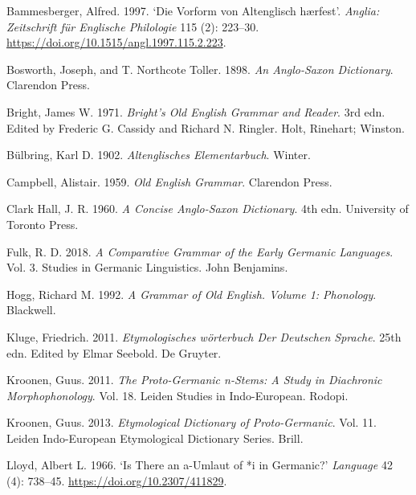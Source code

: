 \documentclass[
  british,
  a4paper,
]{article}
\newlength{\cslhangindent}
\newenvironment{CSLReferences}[2] %
 {\begin{list}{}{%
  \setlength{\itemindent}{0pt}
  \setlength{\leftmargin}{0pt}
  \setlength{\parsep}{0pt}
  \ifodd #1
   \setlength{\leftmargin}{\cslhangindent}
   \setlength{\itemindent}{-1\cslhangindent}
  \fi
  \setlength{\itemsep}{#2\baselineskip}}}
 {\end{list}}
\begin{document}
\protect{}\label{refs}
\begin{CSLReferences}{1}{1}
Bammesberger, Alfred. 1997. {`Die Vorform von Altenglisch {h{æ}rfest}'}.
\emph{Anglia: Zeitschrift f{ü}r Englische Philologie} 115 (2): 223--30.
\url{https://doi.org/10.1515/angl.1997.115.2.223}.

Bosworth, Joseph, and T. Northcote Toller. 1898. \emph{An {Anglo-Saxon}
Dictionary}. Clarendon Press.

Bright, James W. 1971. \emph{Bright's {Old English} Grammar and Reader}.
3rd edn. Edited by Frederic G. Cassidy and Richard N. Ringler. Holt,
Rinehart; Winston.

Bülbring, Karl D. 1902. \emph{Altenglisches Elementarbuch}. Winter.

Campbell, Alistair. 1959. \emph{Old {English} Grammar}. Clarendon Press.

Clark Hall, J. R. 1960. \emph{A Concise {Anglo-Saxon} Dictionary}. 4th
edn. University of Toronto Press.

Fulk, R. D. 2018. \emph{A Comparative Grammar of the Early {Germanic}
Languages}. Vol. 3. Studies in Germanic Linguistics. John Benjamins.

Hogg, Richard M. 1992. \emph{A Grammar of Old English. Volume 1:
Phonology}. Blackwell.

Kluge, Friedrich. 2011. \emph{Etymologisches w{ö}rterbuch Der Deutschen
Sprache}. 25th edn. Edited by Elmar Seebold. De Gruyter.

Kroonen, Guus. 2011. \emph{The {Proto-Germanic} n-Stems: A Study in
Diachronic Morphophonology}. Vol. 18. Leiden Studies in Indo-European.
Rodopi.

Kroonen, Guus. 2013. \emph{Etymological Dictionary of {Proto-Germanic}}.
Vol. 11. Leiden Indo-European Etymological Dictionary Series. Brill.

Lloyd, Albert L. 1966. {`Is There an {a-}Umlaut of *{i} in {Germanic}?'}
\emph{Language} 42 (4): 738--45. \url{https://doi.org/10.2307/411829}.


\end{CSLReferences}
\end{document}
